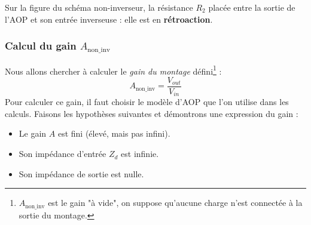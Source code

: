 Sur la figure du schéma non-inverseur, la résistance $R_2$ placée entre la sortie de l'AOP et son entrée inverseuse : elle est en \textbf{rétroaction}. 


\subsubsection{Calcul du gain $A_{\text{non\_inv}}$}
Nous allons chercher à calculer le \textit{gain du montage} défini\footnote{$A_{\text{non\_inv}}$ est le gain "à vide", on suppose qu'aucune charge n'est connectée à la sortie du montage.} :
\begin{equation}
A_{\text{non\_inv}} = \frac{V_{out}}{V_{in}}
\end{equation}
Pour calculer ce gain, il faut choisir le modèle d'AOP que l'on utilise dans les calculs. Faisons les hypothèses suivantes et démontrons une expression du gain :
\begin{itemize}
\item Le gain $A$ est fini (élevé, mais pas infini).
\item Son impédance d'entrée $Z_d$ est infinie.
\item Son impédance de sortie est nulle.
\end{itemize}
